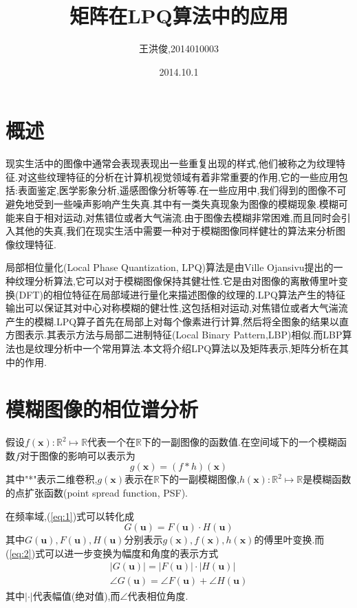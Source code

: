 \documentclass[UTF8,adobefonts]{ctexart}
\title{矩阵在LPQ算法中的应用}
\author{王洪俊,2014010003}
\date{2014.10.1}
\begin{document}
\maketitle      %

\section{概述}
现实生活中的图像中通常会表现表现出一些重复出现的样式,他们被称之为纹理特征.对这些纹理特征的分析在计算机视觉领域有着非常重要的作用,它的一些应用包括:表面鉴定,医学影象分析,遥感图像分析等等.在一些应用中,我们得到的图像不可避免地受到一些噪声影响产生失真.其中有一类失真现象为图像的模糊现象.模糊可能来自于相对运动,对焦错位或者大气湍流.由于图像去模糊非常困难,而且同时会引入其他的失真,我们在现实生活中需要一种对于模糊图像同样健壮的算法来分析图像纹理特征.

局部相位量化(Local Phase Quantization, LPQ)算法是由Ville Ojansivu提出的一种纹理分析算法,它可以对于模糊图像保持其健壮性.它是由对图像的离散傅里叶变换(DFT)的相位特征在局部域进行量化来描述图像的纹理的.LPQ算法产生的特征输出可以保证其对中心对称模糊的健壮性,这包括相对运动,对焦错位或者大气湍流产生的模糊.LPQ算子首先在局部上对每个像素进行计算,然后将全图象的结果以直方图表示.其表示方法与局部二进制特征(Local Binary Pattern,LBP)相似.而LBP算法也是纹理分析中一个常用算法.本文将介绍LPQ算法以及矩阵表示,矩阵分析在其中的作用.

\section{模糊图像的相位谱分析}\label{sec2} 
假设$f(\mathbf{x}):\mathbb{R}^2 \mapsto \mathbb{R}$代表一个在$\mathbb{R}$下的一副图像的函数值.在空间域下的一个模糊函数$f$对于图像的影响可以表示为
\begin{equation}\label{eq:1}
g(\mathbf{x})=(f*h)(\mathbf{x})
\end{equation}
其中"*"表示二维卷积,$g(\mathbf{x})$表示在$\mathbb{R}$下的一副模糊图像,$h(\mathbf{x}):\mathbb{R}^2 \mapsto \mathbb{R}$是模糊函数的点扩张函数(point spread function, PSF).

在频率域,(\ref{eq:1})式可以转化成
\begin{equation}\label{eq:2}
G(\mathbf{u})=F(\mathbf{u}) \cdot H(\mathbf{u})
\end{equation}
其中$G(\mathbf{u}),F(\mathbf{u}),H(\mathbf{u})$分别表示$g(\mathbf{x}),f(\mathbf{x}),h(\mathbf{x})$的傅里叶变换.而(\ref{eq:2})式可以进一步变换为幅度和角度的表示方式
\begin{equation}\label{eq:3}
\begin{split}
 |G(\mathbf{u})| =| F(\mathbf{u})| \cdot |H(\mathbf{u})| \\
\angle G(\mathbf{u})=\angle F(\mathbf{u}) + \angle H(\mathbf{u})
\end{split}
\end{equation}
其中$|\cdot|$代表幅值(绝对值),而$\angle$代表相位角度.
\end{document}
